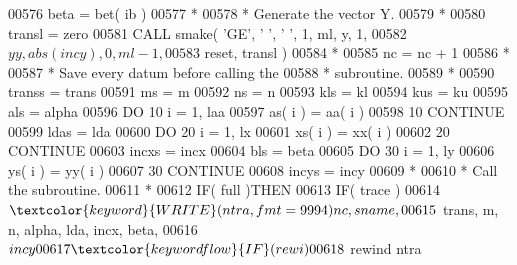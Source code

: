 \begin{DoxyCode}
00576                               beta = bet( ib )
00577 \textcolor{comment}{*}
00578 \textcolor{comment}{*                             Generate the vector Y.}
00579 \textcolor{comment}{*}
00580                               transl = zero
00581                               \textcolor{keyword}{CALL }smake( \textcolor{stringliteral}{'GE'}, \textcolor{stringliteral}{' '}, \textcolor{stringliteral}{' '}, 1, ml, y, 1,
00582      $                                    yy, abs( incy ), 0, ml - 1,
00583      $                                    reset, transl )
00584 \textcolor{comment}{*}
00585                               nc = nc + 1
00586 \textcolor{comment}{*}
00587 \textcolor{comment}{*                             Save every datum before calling the}
00588 \textcolor{comment}{*                             subroutine.}
00589 \textcolor{comment}{*}
00590                               transs = trans
00591                               ms = m
00592                               ns = n
00593                               kls = kl
00594                               kus = ku
00595                               als = alpha
00596                               \textcolor{keywordflow}{DO} 10 i = 1, laa
00597                                  as( i ) = aa( i )
00598    10                         \textcolor{keywordflow}{CONTINUE}
00599                               ldas = lda
00600                               \textcolor{keywordflow}{DO} 20 i = 1, lx
00601                                  xs( i ) = xx( i )
00602    20                         \textcolor{keywordflow}{CONTINUE}
00603                               incxs = incx
00604                               bls = beta
00605                               \textcolor{keywordflow}{DO} 30 i = 1, ly
00606                                  ys( i ) = yy( i )
00607    30                         \textcolor{keywordflow}{CONTINUE}
00608                               incys = incy
00609 \textcolor{comment}{*}
00610 \textcolor{comment}{*                             Call the subroutine.}
00611 \textcolor{comment}{*}
00612                               \textcolor{keywordflow}{IF}( full )\textcolor{keywordflow}{THEN}
00613                                  \textcolor{keywordflow}{IF}( trace )
00614      $                              \textcolor{keyword}{WRITE}( ntra, fmt = 9994 )nc, sname,
00615      $                              trans, m, n, alpha, lda, incx, beta,
00616      $                              incy
00617                                  \textcolor{keywordflow}{IF}( rewi )
00618      $                              rewind ntra

\end{DoxyCode}
